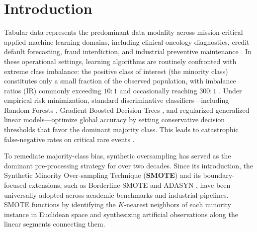 \documentclass[sn-basic]{sn-jnl}
\begin{document}


\maketitle

\section{Introduction}
\label{sec:introduction}

Tabular data represents the predominant data modality across mission-critical applied machine learning domains, including clinical oncology diagnostics, credit default forecasting, fraud interdiction, and industrial preventive maintenance \citep{shwartz2022tabular, grinsztajn2022tree}. In these operational settings, learning algorithms are routinely confronted with extreme class imbalance: the positive class of interest (the minority class) constitutes only a small fraction of the observed population, with imbalance ratios ($\text{IR}$) commonly exceeding $10:1$ and occasionally reaching $300:1$ \citep{le2022survey}. Under empirical risk minimization, standard discriminative classifiers---including Random Forests \citep{breiman2001random}, Gradient Boosted Decision Trees \citep{chen2016xgboost, ke2017lightgbm}, and regularized generalized linear models---optimize global accuracy by setting conservative decision thresholds that favor the dominant majority class. This leads to catastrophic false-negative rates on critical rare events \citep{chawla2002smote}.

To remediate majority-class bias, synthetic oversampling has served as the dominant pre-processing strategy for over two decades. Since its introduction, the Synthetic Minority Over-sampling Technique (\textbf{SMOTE}) \citep{chawla2002smote} and its boundary-focused extensions, such as Borderline-SMOTE \citep{han2005borderline} and ADASYN \citep{he2008adasyn}, have been universally adopted across academic benchmarks and industrial pipelines. SMOTE functions by identifying the $K$-nearest neighbors of each minority instance in Euclidean space and synthesizing artificial observations along the linear segments connecting them. 
\end{document}
